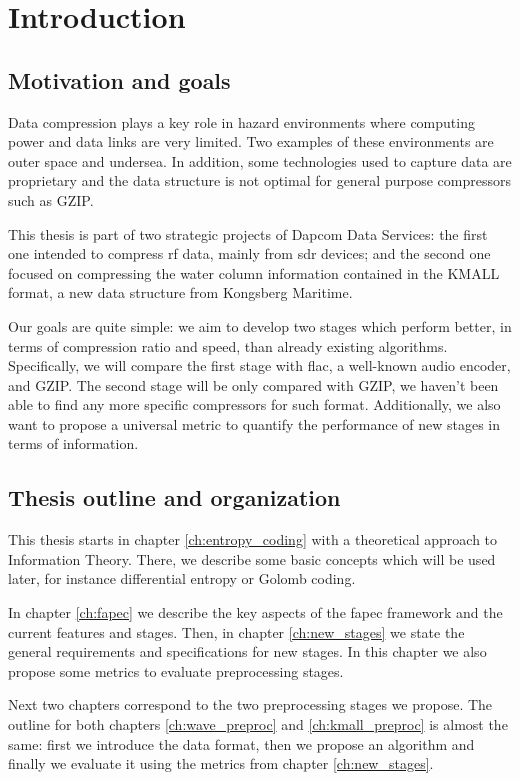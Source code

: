 \chapter{Introduction}
\section{Motivation and goals}
Data compression plays a key role in hazard environments where computing power and data links are very limited. Two examples of these environments are outer space and undersea. In addition, some technologies used to capture data are proprietary and the data structure is not optimal for general purpose compressors such as GZIP.

This thesis is part of two strategic projects of Dapcom Data Services: the first one intended to compress \acrfull{rf} data, mainly from \acrshort{sdr} devices; and the second one focused on compressing the water column information contained in the KMALL format, a new data structure from Kongsberg Maritime.

Our goals are quite simple: we aim to develop two stages which perform better, in terms of compression ratio and speed, than already existing algorithms. Specifically, we will compare the first stage with \acrshort{flac}, a well-known audio encoder, and GZIP. The second stage will be only compared with GZIP, we haven't been able to find any more specific compressors for such format. Additionally, we also want to propose a universal metric to quantify the performance of new stages in terms of information.

\section{Thesis outline and organization}
This thesis starts in chapter \ref{ch:entropy_coding} with a theoretical approach to Information Theory. There, we describe some basic concepts which will be used later, for instance differential entropy or Golomb coding.

In chapter \ref{ch:fapec} we describe the key aspects of the \acrshort{fapec} framework and the current features and stages. Then, in chapter \ref{ch:new_stages} we state the general requirements and specifications for new stages. In this chapter we also propose some metrics to evaluate preprocessing stages.

Next two chapters correspond to the two preprocessing stages we propose. The outline for both chapters \ref{ch:wave_preproc} and \ref{ch:kmall_preproc} is almost the same: first we introduce the data format, then we propose an algorithm and finally we evaluate it using the metrics from chapter \ref{ch:new_stages}.

